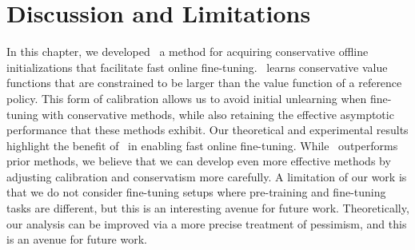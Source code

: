 \vspace{-0.2cm}
\section{Discussion and Limitations}
\vspace{-0.2cm}

In this chapter, we developed \methodname\, a method for acquiring conservative offline initializations that facilitate fast online fine-tuning. \methodname\ learns conservative value functions that are constrained to be larger than the value function of a reference policy. This form of calibration allows us to avoid initial unlearning when fine-tuning with conservative methods, while also retaining the effective asymptotic performance that these methods exhibit. Our theoretical and experimental results highlight the benefit of \methodname\ in enabling fast online fine-tuning. 
While \methodname\ outperforms prior methods, we believe that we can develop even more effective methods by adjusting calibration and conservatism more carefully. A limitation of our work is that we do not consider fine-tuning setups where pre-training and fine-tuning tasks are different, but this is an interesting avenue for future work. Theoretically, our analysis can be improved via a more precise treatment of pessimism, and this is an avenue for future work.